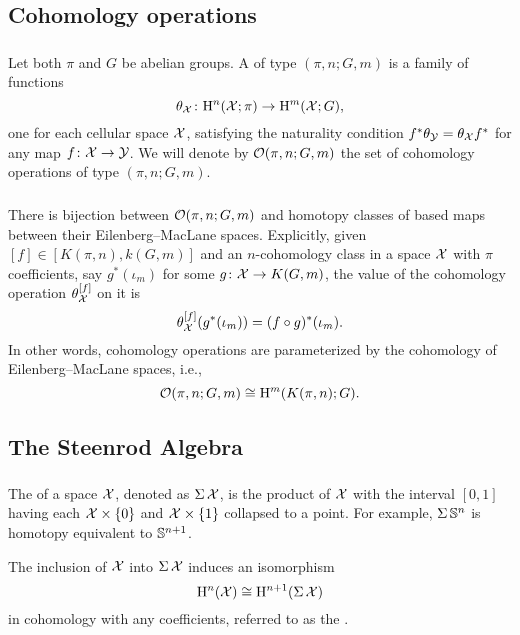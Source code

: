 \subsection{Cohomology operations}

\subsubsection{}
Let both $\pi$ and $G$ be abelian groups.
A  of type $(\pi, n; G, m)$ is a family of functions
\[
\theta_{\mathcal{X}} \colon \mathrm{H}^n(\mathcal{X}; \pi) \to \mathrm{H}^m(\mathcal{X}; G),
\]
one for each cellular space $\mathcal{X}$, satisfying the naturality condition $f^* \theta_{\mathcal{Y}} = \theta_{\mathcal{X}} f^*$ for any map $f \colon \mathcal{X} \to \mathcal{Y}$.
We will denote by $\mathcal{O}(\pi, n; G,m)$ the set of cohomology operations of type $(\pi, n; G,m)$.

\subsubsection{}
There is bijection between $\mathcal{O}(\pi, n; G,m)$ and homotopy classes of based maps between their Eilenberg--MacLane spaces.
Explicitly, given $[f] \in [K(\pi,n), k(G,m)]$ and an $n$-cohomology class in a space $\mathcal{X}$ with $\pi$ coefficients, say $g^*(\iota_m)$ for some $g \colon \mathcal{X} \to K(G, m)$, the value of the cohomology operation $\theta_{\mathcal{X}}^{[f]}$ on it is
\[
\theta_{\mathcal{X}}^{[f]}(g^*(\iota_m)) = (f \circ g)^*(\iota_m).
\]
In other words, cohomology operations are parameterized by the cohomology of Eilenberg--MacLane spaces, i.e.,
\[
\mathcal{O}(\pi, n; G,m) \cong \mathrm{H}^m(K(\pi,n); G).
\]

\subsection{The Steenrod Algebra}\label{ss:steenrod}

\subsubsection{} The  of a space $\mathcal{X}$, denoted as $\operatorname{\Sigma} \mathcal{X}$, is the product of $\mathcal{X}$ with the interval $[0,1]$ having each $\mathcal{X} \times \{0\}$ and $\mathcal{X} \times \{1\}$ collapsed to a point.
For example, $\operatorname{\Sigma} \mathbb{S}^n$ is homotopy equivalent to $\mathbb{S}^{n+1}$.

The inclusion of $\mathcal{X}$ into $\operatorname{\Sigma} \mathcal{X}$ induces an isomorphism
\[
\mathrm{H}^n(\mathcal{X}) \cong \mathrm{H}^{n+1}(\operatorname{\Sigma} \mathcal{X})
\]
in cohomology with any coefficients, referred to as the .

